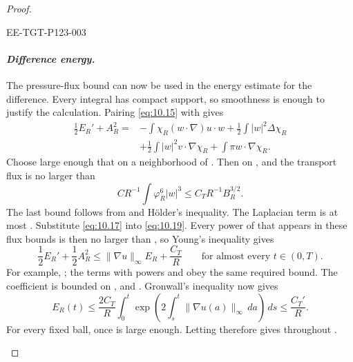 \begin{proof}
\begin{EESegment}{EE-TGT-P123-003}
\paragraph{\normalfont\itshape Difference energy.}
The pressure-flux bound can now be used in the energy estimate for the difference. Every
integral has compact support, so smoothness is enough to justify the calculation. Pairing
\eqref{eq:10.15} with  gives
\[
\begin{aligned}
  \frac12E_R'+A_R^2
  ={}&-\int\chi_R(w\cdot\nabla)u\cdot w
      +\frac12\int|w|^2\Delta\chi_R\\
     &+\frac12\int|w|^2v\cdot\nabla\chi_R
      +\int\pi w\cdot\nabla\chi_R.
\end{aligned}
\]
Choose  large enough that
 on a neighborhood of
. Then
 on
, and the transport flux is no
larger than
\[
  CR^{-1}\int\varphi_R^6|w|^3\leq C_TR^{-1}B_R^{3/2}.
\]
The last bound follows from
 and Hölder's
inequality. The Laplacian term is at most . Substitute
\eqref{eq:10.17} into \eqref{eq:10.19}. Every power of
 that appears in these flux bounds is then no larger than
, so Young's inequality gives
\[
  \frac12E_R'+\frac12A_R^2
  \leq\|\nabla u\|_\infty E_R+\frac{C_T}{R}
  \qquad\text{for almost every }t\in(0,T).
\]
For example,
; the terms
with powers  and  obey the same
required bound. The coefficient  is bounded on
, and . Gronwall's inequality
now gives
\[
  E_R(t)\leq\frac{2C_T}{R}\int_0^t
  \exp\left(2\int_s^t\|\nabla u(a)\|_\infty\,da\right)\,ds
  \leq\frac{C_T'}{R}.
\]
For every fixed ball,  once
 is large enough. Letting 
therefore gives  throughout
.
\end{EESegment}
\end{proof}

